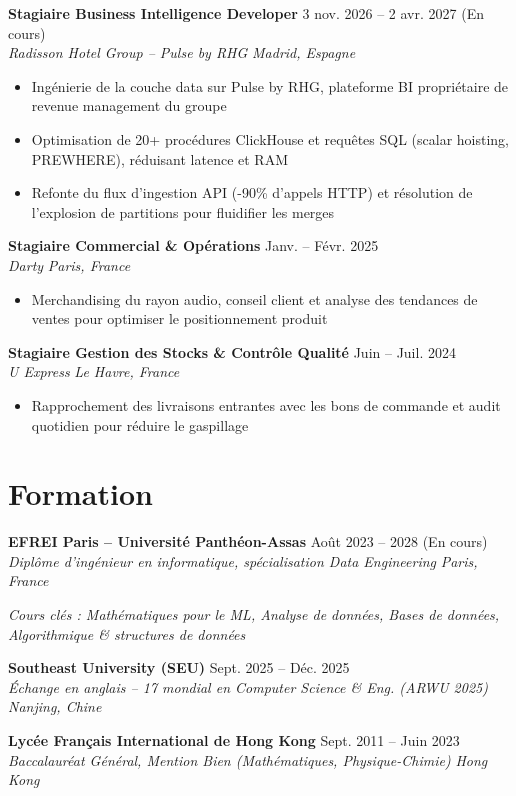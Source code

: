 \documentclass[10pt,a4paper]{article}
\newcommand{\secgap}{\vspace{3.5pt plus 1.5pt minus 1pt}}
\newcommand{\itemgap}{\vspace{2pt plus 1pt minus 0.5pt}}
\newcommand{\job}[4]{%
  \textbf{#1} \hfill #2\\
  \textit{#3} \hfill \textit{#4}\par\vspace{0.5pt}
}
\newcommand{\edu}[4]{%
  \textbf{#1} \hfill #2\\
  \textit{#3} \hfill \textit{#4}\par\vspace{0.5pt}
}
\begin{document}
\job{Stagiaire Business Intelligence Developer}{3 nov. 2026 -- 2 avr. 2027 (En cours)}{Radisson Hotel Group -- Pulse by RHG}{Madrid, Espagne}
\begin{itemize}
  \item Ingénierie de la couche data sur Pulse by RHG, plateforme BI propriétaire de revenue management du groupe
  \item Optimisation de 20+ procédures ClickHouse et requêtes SQL (scalar hoisting, PREWHERE), réduisant latence et RAM
  \item Refonte du flux d'ingestion API (-90\% d'appels HTTP) et résolution de l'explosion de partitions pour fluidifier les merges
\end{itemize}

\itemgap
\job{Stagiaire Commercial \& Opérations}{Janv. -- Févr. 2025}{Darty}{Paris, France}
\begin{itemize}
  \item Merchandising du rayon audio, conseil client et analyse des tendances de ventes pour optimiser le positionnement produit
\end{itemize}

\itemgap
\job{Stagiaire Gestion des Stocks \& Contrôle Qualité}{Juin -- Juil. 2024}{U Express}{Le Havre, France}
\begin{itemize}
  \item Rapprochement des livraisons entrantes avec les bons de commande et audit quotidien pour réduire le gaspillage
\end{itemize}

\secgap
\section{Formation}

\edu{EFREI Paris -- Université Panthéon-Assas}{Août 2023 -- 2028 (En cours)}{Diplôme d'ingénieur en informatique, spécialisation Data Engineering}{Paris, France}
\vspace{-1.5pt}
\textit{\small Cours clés : Mathématiques pour le ML, Analyse de données, Bases de données, Algorithmique \& structures de données}

\itemgap
\edu{Southeast University (SEU)}{Sept. 2025 -- Déc. 2025}{Échange en anglais -- 17\ieme{} mondial en Computer Science \& Eng. (ARWU 2025)}{Nanjing, Chine}

\itemgap
\edu{Lycée Français International de Hong Kong}{Sept. 2011 -- Juin 2023}{Baccalauréat Général, Mention Bien (Mathématiques, Physique-Chimie)}{Hong Kong}
\end{document}
